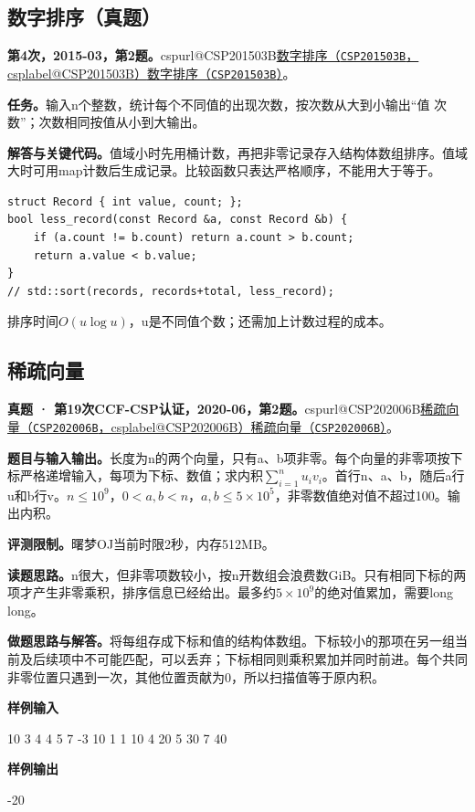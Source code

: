 \documentclass[UTF8,11pt,a4paper,fontset=none]{ctexart}
\makeatletter
\newcommand{\csp}[2]{\ifcsname cspurl@#1\endcsname\href{\csname cspurl@#1\endcsname}{#2（\texttt{#1}，\csname csplabel@#1\endcsname）}\else\href{https://oj.shumeng.tech/p/#1}{#2（\texttt{#1}）}\fi}
\makeatother
\begin{document}
\subsection{数字排序（真题）}
\textbf{第4次，2015-03，第2题。}\csp{CSP201503B}{数字排序}。

\noindent\textbf{任务。}输入n个整数，统计每个不同值的出现次数，按次数从大到小输出“值 次数”；次数相同按值从小到大输出。

\noindent\textbf{解答与关键代码。}值域小时先用桶计数，再把非零记录存入结构体数组排序。值域大时可用map计数后生成记录。比较函数只表达严格顺序，不能用大于等于。
\par\noindent\begin{minipage}{\linewidth}
\begin{lstlisting}
struct Record { int value, count; };
bool less_record(const Record &a, const Record &b) {
    if (a.count != b.count) return a.count > b.count;
    return a.value < b.value;
}
// std::sort(records, records+total, less_record);
\end{lstlisting}
\end{minipage}\par
排序时间$O(u\log u)$，u是不同值个数；还需加上计数过程的成本。
\subsection{稀疏向量}
\textbf{真题 · 第19次CCF-CSP认证，2020-06，第2题。}\csp{CSP202006B}{稀疏向量}。

\noindent\textbf{题目与输入输出。}长度为n的两个向量，只有a、b项非零。每个向量的非零项按下标严格递增输入，每项为下标、数值；求内积$\sum_{i=1}^n u_iv_i$。首行n、a、b，随后a行u和b行v。$n\le10^9$，$0<a,b<n$，$a,b\le5\times10^5$，非零数值绝对值不超过100。输出内积。

\noindent\textbf{评测限制。}曙梦OJ当前时限2秒，内存512MB。

\noindent\textbf{读题思路。}n很大，但非零项数较小，按n开数组会浪费数GiB。只有相同下标的两项才产生非零乘积，排序信息已经给出。最多约$5\times10^9$的绝对值累加，需要long long。

\noindent\textbf{做题思路与解答。}将每组存成下标和值的结构体数组。下标较小的那项在另一组当前及后续项中不可能匹配，可以丢弃；下标相同则乘积累加并同时前进。每个共同非零位置只遇到一次，其他位置贡献为0，所以扫描值等于原内积。
\begin{tcolorbox}[samplebox,title={输入输出样例}]
\textbf{样例输入}
\begin{Sample}
10 3 4
4 5
7 -3
10 1
1 10
4 20
5 30
7 40
\end{Sample}
\tcblower
\textbf{样例输出}
\begin{Sample}
-20
\end{Sample}
\end{tcolorbox}
\end{document}
